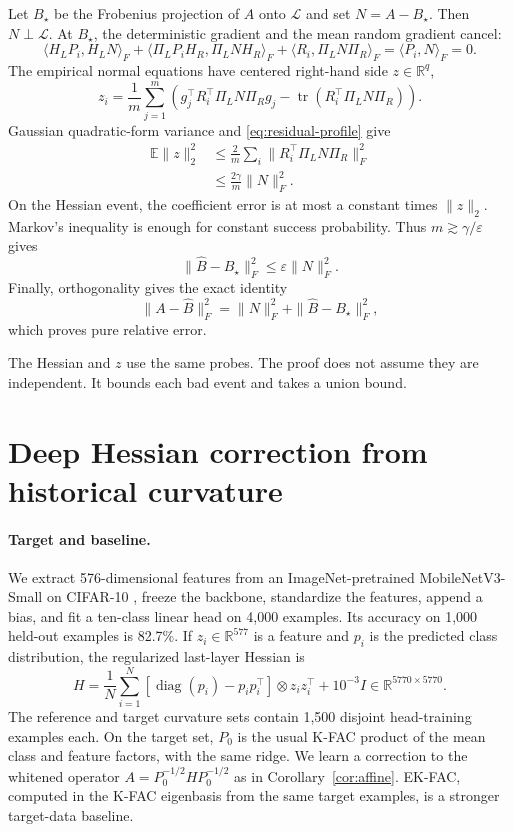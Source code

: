 \documentclass{article}
\theoremstyle{remark}
\newcommand{\E}{\mathbb E}
\newcommand{\cL}{\mathcal L}
\newcommand{\eps}{\varepsilon}
\newcommand{\tr}{\operatorname{tr}}
\newcommand{\1}{\mathbf 1}
\begin{document}
Let $B_\star$ be the Frobenius projection of $A$ onto $\cL$ and set $N=A-B_\star$.  Then $N\perp\cL$.  At $B_\star$, the deterministic gradient and the mean random gradient cancel:
\begin{equation}
 \langle H_LP_i,H_LN\rangle_F+
 \langle\Pi_LP_iH_R,\Pi_LNH_R\rangle_F+
 \langle R_i,\Pi_LN\Pi_R\rangle_F
 =\langle P_i,N\rangle_F=0.
 \label{eq:gradient-cancel}
\end{equation}
The empirical normal equations have centered right-hand side $z\in\mathbb R^q$,
\begin{equation}
 z_i=\frac1m\sum_{j=1}^m
 \left(g_j^\top R_i^\top\Pi_LN\Pi_Rg_j
 -\tr(R_i^\top\Pi_LN\Pi_R)\right).
 \label{eq:z}
\end{equation}
Gaussian quadratic-form variance and \eqref{eq:residual-profile} give
\begin{align}
 \E\|z\|_2^2
 &\le\frac2m\sum_i\|R_i^\top\Pi_LN\Pi_R\|_F^2 \\
 &\le\frac{2\gamma}{m}\|N\|_F^2.
 \label{eq:z-bound}
\end{align}
On the Hessian event, the coefficient error is at most a constant times $\|z\|_2$.  Markov's inequality is enough for constant success probability. Thus $m\gtrsim\gamma/\eps$ gives \[ \|\widehat B-B_\star\|_F^2\le\eps\|N\|_F^2. \] Finally, orthogonality gives the exact identity
\begin{equation}
 \|A-\widehat B\|_F^2
 =\|N\|_F^2+\|\widehat B-B_\star\|_F^2,
 \label{eq:pythagorean}
\end{equation}
which proves pure relative error.

The Hessian and $z$ use the same probes.  The proof does not assume they are independent.  It bounds each bad event and takes a union bound.

\section{Deep Hessian correction from historical curvature}
\label{sec:experiments}

\paragraph{Target and baseline.}
We extract 576-dimensional features from an ImageNet-pretrained MobileNetV3-Small on CIFAR-10 \citep{howard2019mobilenet,krizhevsky2009cifar}, freeze the backbone, standardize the features, append a bias, and fit a ten-class linear head on 4,000 examples.  Its accuracy on 1,000 held-out examples is 82.7\%.  If $z_i\in\mathbb R^{577}$ is a feature and $p_i$ is the predicted class distribution, the regularized last-layer Hessian is \[ H=\frac1N\sum_{i=1}^N [\operatorname{diag}(p_i)-p_ip_i^\top]\otimes z_iz_i^\top +10^{-3}I\in\mathbb R^{5770\times5770}. \] The reference and target curvature sets contain 1,500 disjoint head-training examples each.  On the target set, $P_0$ is the usual K-FAC product of the mean class and feature factors, with the same ridge.  We learn a correction to the whitened operator $A=P_0^{-1/2}HP_0^{-1/2}$ as in Corollary~\ref{cor:affine}.  EK-FAC, computed in the K-FAC eigenbasis from the same target examples, is a stronger target-data baseline.
\end{document}
